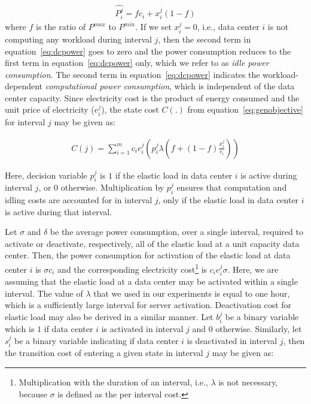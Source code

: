 \begin{align}
\label{eq:dcpower}
\hat{P_i^j} = fc_i + x_i^j\left(1-f\right)
\end{align}
where $f$ is the ratio of $P^{max}$ to $P^{min}$. If we set $x_i^j=0$, i.e., data center $i$ is not computing any workload during interval $j$, then the second term in equation~\ref{eq:dcpower} goes to zero and the power consumption reduces to the first term in equation~\ref{eq:dcpower} only, which we refer to as \textit{idle power consumption}. The second term in equation~\ref{eq:dcpower} indicates the workload-dependent \textit{computational power consumption}, which is independent of the data center capacity. Since electricity cost is the product of energy consumed and the unit price of electricity ($e_i^j$), the state cost $C(.)$ from equation~\ref{eq:genobjective} for interval $j$ may be given as:

\begin{align}
C(j) = \sum_{i=1}^{m} c_i e_i^j\left(p_i^j \lambda\left(f+\left(1-f\right)\frac{x_i^j}{c_i}\right)\right)
\end{align}

Here, decision variable $p_i^j$ is $1$ if the elastic load in data center $i$ is active during interval $j$, or $0$ otherwise. Multiplication by $p_i^j$ ensures that computation and idling costs are accounted for in interval $j$, only if the elastic load in data center $i$ is active during that interval.

Let $\sigma$ and $\delta$ be the average power consumption, over a single interval, required to activate or deactivate, respectively, all of the elastic load at a unit capacity data center. Then, the power consumption for activation of the elastic load at data center $i$ is $\sigma c_i$ and the corresponding electricity cost\footnote{Multiplication with the duration of an interval, i.e., $\lambda$ is not necessary, because $\sigma$ is defined as the per interval cost.} is $c_ie_i^j\sigma$. Here, we are assuming that the elastic load at a data center may be activated within a single interval. The value of $\lambda$ that we used in our experiments is equal to one hour, which is a sufficiently large interval for server activation. Deactivation cost for elastic load may also be derived in a similar manner. Let $b_i^j$ be a binary variable which is $1$ if data center $i$ is activated in interval $j$ and $0$ otherwise. Similarly, let $s_i^j$ be a binary variable indicating if data center $i$ is deactivated in interval $j$, then the transition cost of entering a given state in interval $j$ may be given as:

